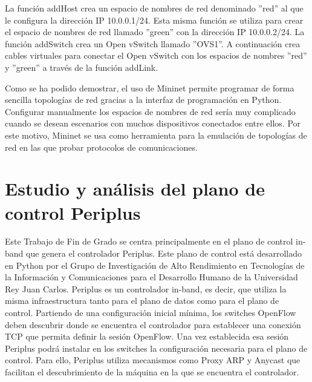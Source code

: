 \documentclass[a4paper, 12pt]{book}
\begin{document}
	La función addHost crea un espacio de nombres de red denominado ''red'' al que le configura
	la dirección IP 10.0.0.1/24. Esta misma función se utiliza para crear el espacio de nombres de
	red llamado ''green'' con la dirección IP 10.0.0.2/24.
	La función addSwitch crea un Open vSwitch llamado ''OVS1''. A continuación crea cables virtuales
	para conectar el Open vSwitch con los espacios de nombres ''red'' y ''green'' a través de la función
	addLink.
	
	Como se ha podido demostrar, el uso de Mininet permite programar de forma sencilla
	topologías de red gracias a la interfaz de programación en Python. Configurar manualmente
	los espacios de nombres de red sería muy complicado cuando se desean escenarios con
	muchos dispositivos conectados entre ellos. Por este motivo, Mininet se usa como herramienta
	para la emulación de topologías de red en las que probar protocolos de comunicaciones.
	
	
	
	\cleardoublepage %
	\chapter{Estudio y análisis del plano de control Periplus} %
	\label{chap:periplus} %
	
	Este Trabajo de Fin de Grado se centra principalmente en el plano de control in-band que genera el controlador Periplus. Este plano de control está desarrollado en Python por el Grupo de Investigación de Alto Rendimiento en Tecnologías de la Información y Comunicaciones para el Desarrollo Humano de la Universidad Rey Juan Carlos. Periplus es un controlador in-band, es decir, que utiliza la misma infraestructura tanto para el plano de datos como para el plano de control. Partiendo de una configuración inicial mínima, los switches OpenFlow deben descubrir donde
	se encuentra el controlador para establecer una conexión TCP que permita definir la sesión
	OpenFlow. Una vez establecida esa sesión Periplus podrá instalar en los switches la configuración
	necesaria para el plano de control.	Para ello, Periplus utiliza mecanismos como Proxy ARP y Anycast que facilitan el descubrimiento de la máquina en la que se encuentra el controlador.
	
\end{document}
